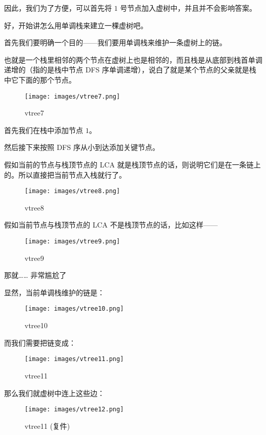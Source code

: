 {因此，我们为了方便，可以首先将 $1$ 号节点加入虚树中，并且并不会影响答案。

好，开始讲怎么用单调栈来建立一棵虚树吧。

首先我们要明确一个目的——我们要用单调栈来维护一条虚树上的链。

也就是一个栈里相邻的两个节点在虚树上也是相邻的，而且栈是从底部到栈首单调递增的（指的是栈中节点 DFS 序单调递增），说白了就是某个节点的父亲就是栈中它下面的那个节点。

\begin{figure}[h]
\centering
\texttt{[image: images/vtree7.png]} 
\caption{vtree7}
\end{figure}

首先我们在栈中添加节点 $1$。

然后接下来按照 DFS 序从小到达添加关键节点。

假如当前的节点与栈顶节点的 LCA 就是栈顶节点的话，则说明它们是在一条链上的。所以直接把当前节点入栈就行了。

\begin{figure}[h]
\centering
\texttt{[image: images/vtree8.png]} 
\caption{vtree8}
\end{figure}

假如当前节点与栈顶节点的 LCA 不是栈顶节点的话，比如这样——

\begin{figure}[h]
\centering
\texttt{[image: images/vtree9.png]} 
\caption{vtree9}
\end{figure}

那就…… 非常尴尬了

显然，当前单调栈维护的链是：

\begin{figure}[h]
\centering
\texttt{[image: images/vtree10.png]} 
\caption{vtree10}
\end{figure}

而我们需要把链变成：

\begin{figure}[h]
\centering
\texttt{[image: images/vtree11.png]} 
\caption{vtree11}
\end{figure}

那么我们就虚树中连上这些边：

\begin{figure}[h]
\centering
\texttt{[image: images/vtree12.png]} 
\caption{vtree11 (复件)}
\end{figure}

}
